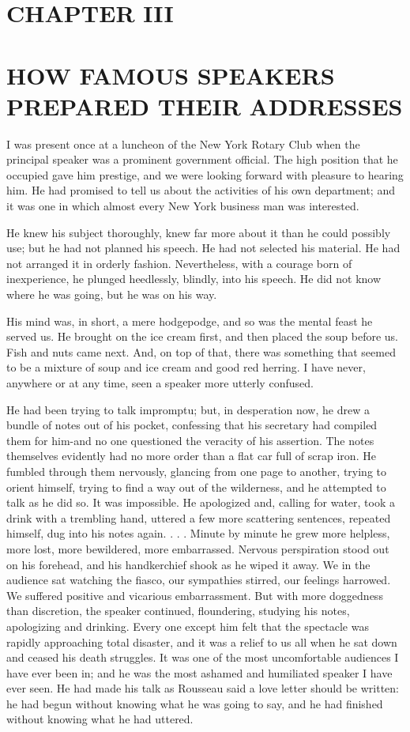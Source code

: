 \documentclass[10pt]{article}
\begin{document}
\section*{CHAPTER III}
\section*{HOW FAMOUS SPEAKERS PREPARED THEIR ADDRESSES}
I was present once at a luncheon of the New York Rotary Club when the principal speaker was a prominent government official. The high position that he occupied gave him prestige, and we were looking forward with pleasure to hearing him. He had promised to tell us about the activities of his own department; and it was one in which almost every New York business man was interested.

He knew his subject thoroughly, knew far more about it than he could possibly use; but he had not planned his speech. He had not selected his material. He had not arranged it in orderly fashion. Nevertheless, with a courage born of inexperience, he plunged heedlessly, blindly, into his speech. He did not know where he was going, but he was on his way.

His mind was, in short, a mere hodgepodge, and so was the mental feast he served us. He brought on the ice cream first, and then placed the soup before us. Fish and nuts came next. And, on top of that, there was something that seemed to be a mixture of soup and ice cream and good red herring. I have never, anywhere or at any time, seen a speaker more utterly confused.

He had been trying to talk impromptu; but, in desperation now, he drew a bundle of notes out of his pocket, confessing that his secretary had compiled them for him-and no one questioned the veracity of his assertion. The notes themselves evidently had no more order than a flat car full of scrap iron. He fumbled through them nervously, glancing from one page to another, trying to orient himself, trying to find a way out of the wilderness, and he attempted to talk as he did so. It was impossible. He apologized and, calling for water, took a drink with a trembling hand, uttered a few more scattering sentences, repeated himself, dug into his notes again. . . . Minute by minute he grew more helpless, more lost, more bewildered, more embarrassed. Nervous perspiration stood out on his forehead, and his handkerchief shook as he wiped it away. We in the audience sat watching the fiasco, our sympathies stirred, our feelings harrowed. We suffered positive and vicarious embarrassment. But with more doggedness than discretion, the speaker continued, floundering, studying his notes, apologizing and drinking. Every one except him felt that the spectacle was rapidly approaching total disaster, and it was a relief to us all when he sat down and ceased his death struggles. It was one of the most uncomfortable audiences I have ever been in; and he was the most ashamed and humiliated speaker I have ever seen. He had made his talk as Rousseau said a love letter should be written: he had begun without knowing what he was going to say, and he had finished without knowing what he had uttered.
\end{document}
